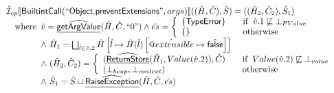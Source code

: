 \[\begin{array}{ll}
\aI _{cp}\lbr \SF{BuiltintCall}(``\SF{Object.preventExtensions}",args)\rbr((\hat{H},\hat{C}), \hat{S})
  = ((\hat{H}_2, \hat{C}_2), \hat{S}_1)\\
\quad\wherec{
 \hat{v} =\ahf{getArgValue}(\hat{H}, \hat{C}, ``0")
  \land \hat{es} =
    \left\{
    \begin{array}{l@{\quad\quad}l}
      \{ \SF{TypeError} \} & \ifc{\hat{v}.1 \not\sqsubseteq \bot_{PValue}}\\
      \{ \}& \owc\\
    \end{array}
    \right.\\
  \land\ \hat{H}_1 = \bigsqcup_{\hat{l} \in \hat{v}.2} \hat{H}
    \left[\hat{l} \mapsto \hat{H}(\hat{l})
      \left[\avarprop{extensible} \mapsto \afalse\right]\right]\\
  \land\ (\hat{H}_2, \hat{C}_2) = 
    \left\{\begin{array}{l@{\quad\quad}l}
      (\ahf{ReturnStore}(\hat{H}_1, Value(\hat{v}.2)), \hat{C})
      & \ifc{Value(\hat{v}.2) \not\sqsubseteq \bot_{value}}\\
      (\bot_{heap}, \bot_{context}) & \owc \\
    \end{array}\right.\\
  \land\ \hat{S}_1 = \hat{S} \sqcup \ahf{RaiseException}(\hat{H}, \hat{C}, \hat{es})\\
  }\\
\\\\ 


\end{array}
\]
